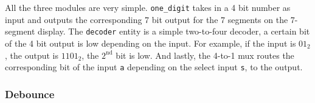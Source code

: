 \documentclass[aps, secnumarabic, balancelastpage, asmath, amssymb, nofootinbib, floatfix,]{revtex4-2}
\begin{document}
{All the three modules are very simple. \verb|one_digit| takes in a 4 bit number as input and outputs the corresponding 7 bit output for the 7 segments on the 7-segment display. The \verb|decoder| entity is a simple two-to-four decoder, a certain bit of the 4 bit output is low depending on the input. For example, if the input is $01_2$, the output is $1101_2$, the $2^{\text{nd}}$ bit is low. And lastly, the 4-to-1 mux routes the corresponding bit of the input \verb|a| depending on the select input \verb|s|, to the output.

\subsubsection{\fontsize{10pt}{12pt}\selectfont \bf Debounce \label{sec:2.2.5}}












}
\end{document}
